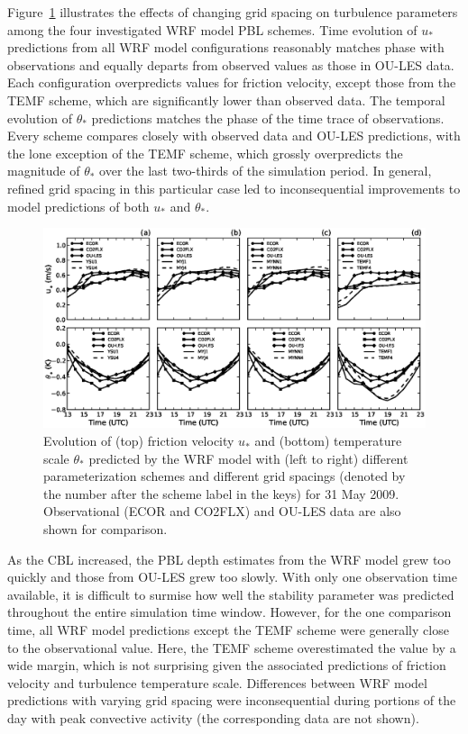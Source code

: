 Figure~\ref{figure437} illustrates the effects of changing grid spacing on turbulence parameters among the four investigated WRF model PBL schemes. Time evolution of $u_*$ predictions from all WRF model configurations reasonably matches phase with observations and equally departs from observed values as those in OU-LES data. Each configuration overpredicts values for friction velocity, except those from the TEMF scheme, which are significantly lower than observed data. The temporal evolution of $\theta_*$ predictions matches the phase of the time trace of observations. Every scheme compares closely with observed data and OU-LES predictions, with the lone exception of the TEMF scheme, which grossly overpredicts the magnitude of $\theta_*$ over the last two-thirds of the simulation period. In general, refined grid spacing in this particular case led to inconsequential improvements to model predictions of both $u_*$ and $\theta_*$. 


\begin{figure}[ht!]
\begin{center}
\includegraphics[width=\textwidth]{figures/chapter4/ust_tst_grid_20090531}
\end{center}
\caption{Evolution of (top) friction velocity $u_*$ and (bottom) temperature scale $\theta_*$ predicted by the WRF model with (left to right) different parameterization schemes and different grid spacings (denoted by the number after the scheme label in the keys) for 31 May 2009. Observational (ECOR and CO2FLX) and OU-LES data are also shown for comparison.}
\label{figure437}
\end{figure}


As the CBL increased, the PBL depth estimates from the WRF model grew too quickly and those from OU-LES grew too slowly. With only one observation time available, it is difficult to surmise how well the stability parameter was predicted throughout the entire simulation time window. However, for the one comparison time, all WRF model predictions except the TEMF scheme were generally close to the observational value. Here, the TEMF scheme overestimated the value by a wide margin, which is not surprising given the associated predictions of friction velocity and turbulence temperature scale. Differences between WRF model predictions with varying grid spacing were inconsequential during portions of the day with peak convective activity (the corresponding data are not shown). 


